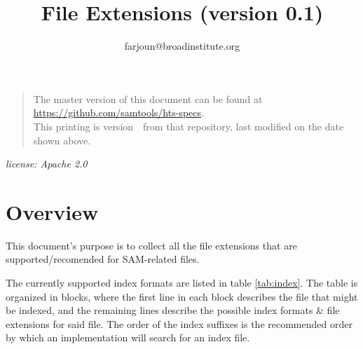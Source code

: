 \documentclass[a4paper]{article}
\begin{document}

\title{File Extensions (version 0.1)}
\author{farjoun@broadinstitute.org}
\date{\headdate}
\maketitle

\begin{quote}\small
The master version of this document can be found at
\url{https://github.com/samtools/hts-specs}.\\
This printing is version~\commitdesc\ from that repository,
last modified on the date shown above.
\end{quote}

\begin{center}
\textit{license: Apache 2.0}
\end{center}

\section{\textbf{Overview}}
This document's purpose is to collect all the file extensions that are supported/recomended for SAM-related files.


The currently supported index formats are listed in table \ref{tab:index}.
The table is organized in blocks, where the first line in each block describes the file that might be indexed, and the 
remaining lines describe the possible index formats \& file extensions for said file. 
The order of the index suffixes is the recommended order by which an implementation will search for an index file.
\end{document}
